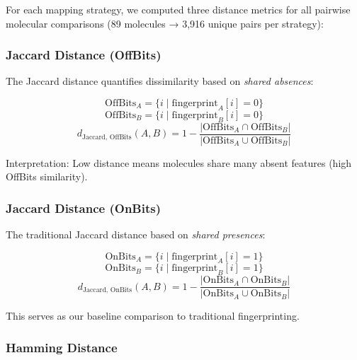 \documentclass[11pt,letterpaper]{article}
\begin{document}
For each mapping strategy, we computed three distance metrics for all pairwise molecular comparisons (89 molecules → 3,916 unique pairs per strategy):

\subsubsection{Jaccard Distance (OffBits)}

The Jaccard distance quantifies dissimilarity based on \textit{shared absences}:

\begin{equation}
\text{OffBits}_A = \{i \mid \text{fingerprint}_A[i] = 0\}
\end{equation}
\begin{equation}
\text{OffBits}_B = \{i \mid \text{fingerprint}_B[i] = 0\}
\end{equation}
\begin{equation}
d_{\text{Jaccard, OffBits}}(A, B) = 1 - \frac{|\text{OffBits}_A \cap \text{OffBits}_B|}{|\text{OffBits}_A \cup \text{OffBits}_B|}
\end{equation}

Interpretation: Low distance means molecules share many absent features (high OffBits similarity).

\subsubsection{Jaccard Distance (OnBits)}

The traditional Jaccard distance based on \textit{shared presences}:

\begin{equation}
\text{OnBits}_A = \{i \mid \text{fingerprint}_A[i] = 1\}
\end{equation}
\begin{equation}
\text{OnBits}_B = \{i \mid \text{fingerprint}_B[i] = 1\}
\end{equation}
\begin{equation}
d_{\text{Jaccard, OnBits}}(A, B) = 1 - \frac{|\text{OnBits}_A \cap \text{OnBits}_B|}{|\text{OnBits}_A \cup \text{OnBits}_B|}
\end{equation}

This serves as our baseline comparison to traditional fingerprinting.

\subsubsection{Hamming Distance}
\end{document}
